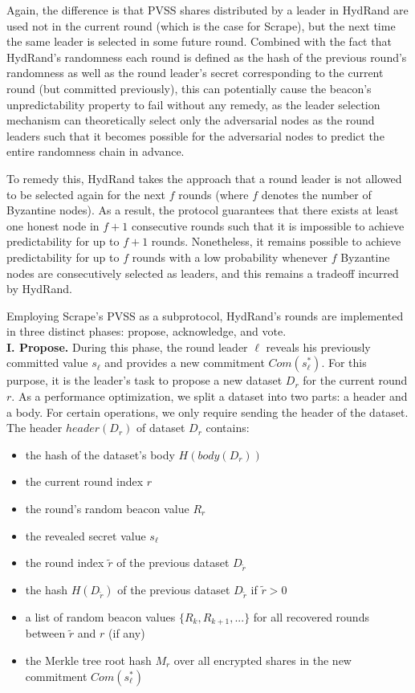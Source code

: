 \documentclass[11pt]{article}
\theoremstyle{definition}
\theoremstyle{remark}
\begin{document}
Again, the difference is that PVSS shares distributed by a leader in HydRand are used not in the current round (which is the case for Scrape), but the next time the same leader is selected in some future round. Combined with the fact that HydRand's randomness each round is defined as the hash of the previous round's randomness as well as the round leader's secret corresponding to the current round (but committed previously), this can potentially cause the beacon's unpredictability property to fail without any remedy, as the leader selection mechanism can theoretically select only the adversarial nodes as the round leaders such that it becomes possible for the adversarial nodes to predict the entire randomness chain in advance.

To remedy this, HydRand takes the approach that a round leader is not allowed to be selected again for the next $f$ rounds (where $f$ denotes the number of Byzantine nodes). As a result, the protocol guarantees that there exists at least one honest node in $f + 1$ consecutive rounds such that it is impossible to achieve predictability for up to $f + 1$ rounds. Nonetheless, it remains possible to achieve predictability for up to $f$ rounds with a low probability whenever $f$ Byzantine nodes are consecutively selected as leaders, and this remains a tradeoff incurred by HydRand.

Employing Scrape's PVSS as a subprotocol, HydRand's rounds are implemented in three distinct phases: propose, acknowledge, and vote.\\

\textbf{I. Propose.} During this phase, the round leader $\ell$ reveals his previously committed value $s_\ell$ and provides a new commitment $Com(s^*_\ell)$. For this purpose, it is the leader's task to propose a new dataset $D_r$ for the current round $r$. As a performance optimization, we split a dataset into two parts: a header and a body. For certain operations, we only require sending the header of the dataset. The header $header(D_r)$ of dataset $D_r$ contains:
\begin{itemize}
\item the hash of the dataset's body $H(body(D_r))$
\item the current round index $r$
\item the round's random beacon value $R_r$
\item the revealed secret value $s_\ell$
\item the round index $\tilde{r}$ of the previous dataset $D_{\tilde{r}}$
\item the hash $H(D_{\tilde{r}})$ of the previous dataset $D_{\tilde{r}}$ if $\tilde{r} > 0$
\item a list of random beacon values $\{R_k, R_{k + 1}, ...\}$ for all recovered rounds between $\tilde{r}$ and $r$ (if any)
\item the Merkle tree root hash $M_r$ over all encrypted shares in the new commitment $Com(s^*_\ell)$
\end{itemize}
\end{document}
